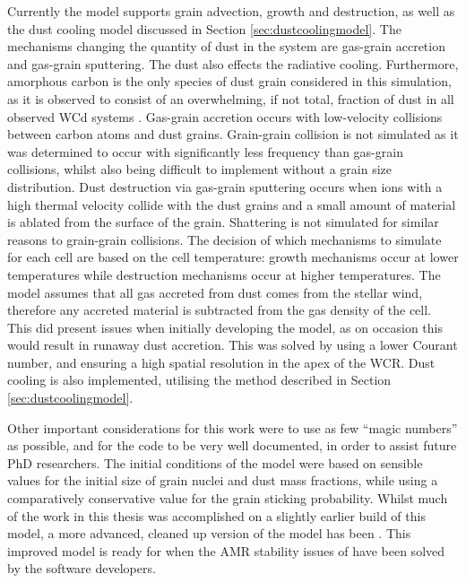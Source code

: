 Currently the \bidmas{} model supports grain advection, growth and destruction, as well as the dust cooling model discussed in Section \ref{sec:dustcoolingmodel}.
The mechanisms changing the quantity of dust in the system are gas-grain accretion and gas-grain sputtering.
The dust also effects the radiative cooling.
Furthermore, amorphous carbon is the only species of dust grain considered in this simulation, as it is observed to consist of an overwhelming, if not total, fraction of dust in all observed WCd systems \parencite{crowther_dust_2003}.
Gas-grain accretion occurs with low-velocity collisions between carbon atoms and dust grains.
Grain-grain collision is not simulated as it was determined to occur with significantly less frequency than gas-grain collisions, whilst also being difficult to implement without a grain size distribution.
Dust destruction via gas-grain sputtering occurs when ions with a high thermal velocity collide with the dust grains and a small amount of material is ablated from the surface of the grain.
Shattering is not simulated for similar reasons to grain-grain collisions.
The decision of which mechanisms to simulate for each cell are based on the cell temperature: growth mechanisms occur at lower temperatures while destruction mechanisms occur at higher temperatures.
The \bidmas{} model assumes that all gas accreted from dust comes from the stellar wind, therefore any accreted material is subtracted from the gas density of the cell.
This did present issues when initially developing the model, as on occasion this would result in runaway dust accretion.
This was solved by using a lower Courant number, and ensuring a high spatial resolution in the apex of the WCR.
Dust cooling is also implemented, utilising the method described in Section \ref{sec:dustcoolingmodel}. 

Other important considerations for this work were to use as few ``magic numbers'' as possible, and for the code to be very well documented, in order to assist future PhD researchers.
The initial conditions of the model were based on sensible values for the initial size of grain nuclei and dust mass fractions, while using a comparatively conservative value for the grain sticking probability.
Whilst much of the work in this thesis was accomplished on a slightly earlier build of this model, a more advanced, cleaned up version of the model has been .
This improved model is ready for when the AMR stability issues of \athena{} have been solved by the software developers.


